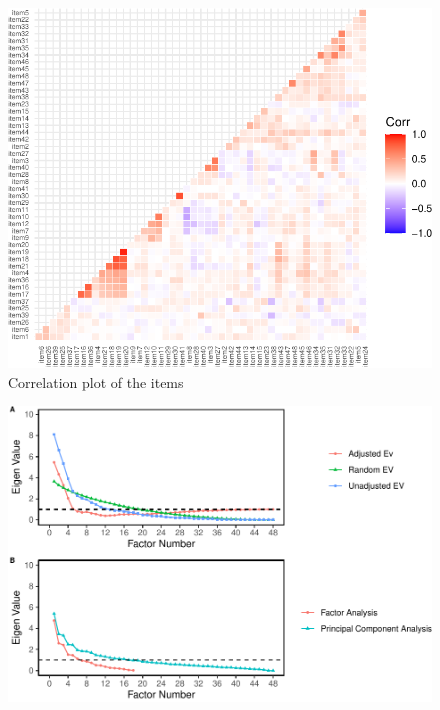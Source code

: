 \documentclass[
  english,
  man]{apa6}
\begin{document}
\begin{appendix}
\begin{figure}

{\centering \includegraphics[width=1\linewidth]{manuscript_files/figure-latex/figCorAppB-1} 

}

\caption{Correlation plot of the items}\label{fig:figCorAppB}
\end{figure}

\begin{figure}

{\centering \includegraphics[width=1\linewidth,height=1\textheight]{manuscript_files/figure-latex/facIdFigAppB-1} 

}


\end{figure}
\end{appendix}
\end{document}
